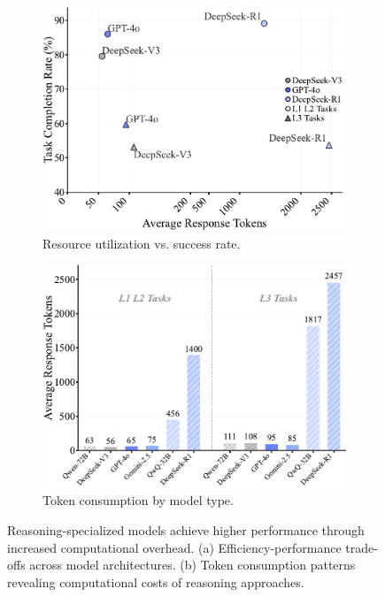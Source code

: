 \begin{figure}[htbp]
    \centering
    \begin{subfigure}[b]{0.48\textwidth}
        \centering
        \includegraphics[width=\textwidth,clip]{figures/ae_3_efficiency_scatter.pdf}
        \caption{Resource utilization vs. success rate.}
        \label{fig:efficiency-analysis}
    \end{subfigure}
    \hfill
    \begin{subfigure}[b]{0.48\textwidth}
        \centering
        \includegraphics[width=\textwidth,clip]{figures/ae_3_token_consumption.pdf}
        \caption{Token consumption by model type.}
        \label{fig:token-consumption}
    \end{subfigure}
    \caption{Reasoning-specialized models achieve higher performance through increased computational overhead. (a) Efficiency-performance trade-offs across model architectures. (b) Token consumption patterns revealing computational costs of reasoning approaches.}
    \label{fig:combined-analysis}
\end{figure}

